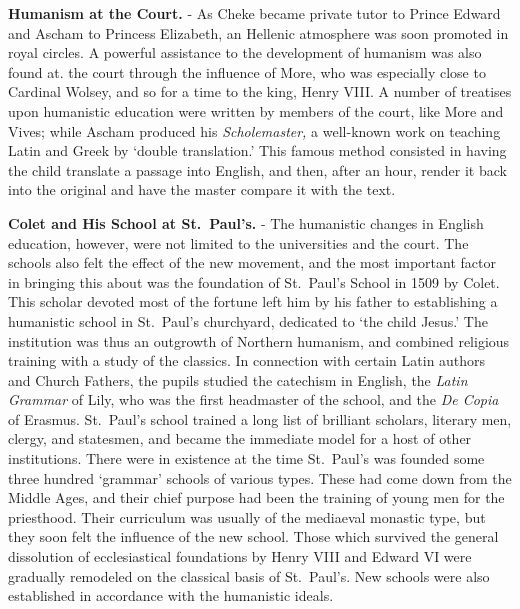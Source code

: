 \documentclass[]{book}
\begin{document}
\textbf{Humanism at the Court.} - As Cheke became private tutor to Prince Edward and Ascham to Princess Elizabeth, an Hellenic atmosphere was soon promoted in royal circles. A powerful assistance to the development of humanism was also found at. the court through the influence of More, who was especially close to Cardinal Wolsey, and so for a time to the king, Henry VIII. A number of treatises upon humanistic education were written by members of the court, like More and Vives; while Ascham produced his \emph{Scholemaster,} a well-known work on teaching Latin and Greek by `double translation.' This famous method consisted in having the child translate a passage into English, and then, after an hour, render it back into the original and have the master compare it with the text.

\textbf{Colet and His School at St.~Paul's.} - The humanistic changes in English education, however, were not limited to the universities and the court. The schools also felt the effect of the new movement, and the most important factor in bringing this about was the foundation of St.~Paul's School in 1509 by Colet. This scholar devoted most of the fortune left him by his father to establishing a humanistic school in St.~Paul's churchyard, dedicated to `the child Jesus.' The institution was thus an outgrowth of Northern humanism, and combined religious training with a study of the classics. In connection with certain Latin authors and Church Fathers, the pupils studied the catechism in English, the \emph{Latin Grammar} of Lily, who was the first headmaster of the school, and the \emph{De Copia} of Erasmus. St.~Paul's school trained a long list of brilliant scholars, literary men, clergy, and statesmen, and became the immediate model for a host of other institutions. There were in existence at the time St.~Paul's was founded some three hundred `grammar' schools of various types. These had come down from the Middle Ages, and their chief purpose had been the training of young men for the priesthood. Their curriculum was usually of the mediaeval monastic type, but they soon felt the influence of the new school. Those which survived the general dissolution of ecclesiastical foundations by Henry VIII and Edward VI were gradually remodeled on the classical basis of St.~Paul's. New schools were also established in accordance with the humanistic ideals.
\end{document}

